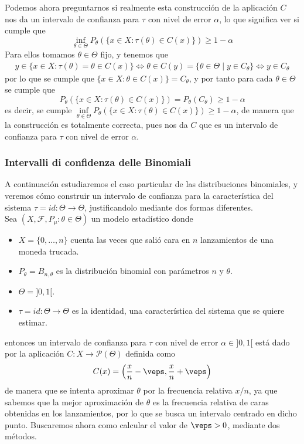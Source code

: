 \noindent
Podemos ahora preguntarnos si realmente esta construcción de la aplicación $C$ nos da un intervalo de confianza para $\tau$ con nivel de error $\alpha$, lo que significa ver si cumple que 
$$\inf_{\theta \in \Theta} P_{\theta}(\{x \in X : \tau(\theta) \in C(x)\}) \geq 1 - \alpha$$ 
Para ellos tomamos $\theta \in \Theta$ fijo, y tenemos que
\begin{align*}
    y\in \{x\in X : \tau(\theta)=\theta \in C(x)\} \iff  \theta \in C(y)=\{\theta\in \Theta \mid y\in C_{\theta}\} \iff y\in C_{\theta} 
\end{align*}
por lo que se cumple que $\{x\in X : \theta \in C(x)\} = C_{\theta}$, y por tanto para cada $\theta \in \Theta$ se cumple que
\begin{equation*}
    P_{\theta}(\{x \in X : \tau(\theta) \in C(x)\}) = P_{\theta}(C_{\theta}) \geq 1 - \alpha
\end{equation*}
es decir, se cumple $\inf\limits_{\theta \in \Theta} P_{\theta}(\{x \in X : \tau(\theta) \in C(x)\}) \geq 1 - \alpha$, de manera que la construcción es totalmente correcta, pues nos da $C$ que es un intervalo de confianza para $\tau$ con nivel de error $\alpha$.

\subsubsection{Intervalli di confidenza delle Binomiali}
\noindent
A continuación estudiaremos el caso particular de las distribuciones binomiales, y veremos cómo construir un intervalo de confianza para la característica del sistema $\tau=id: \Theta \to \Theta$, justificandolo mediante dos formas diferentes. \\
\noindent
Sea $(X, \mathcal{F}, P_{\mu}: \theta \in \Theta)$ un modelo estadístico donde 
\begin{itemize}
    \item $X=\{0,\ldots, n\}$ cuenta las veces que salió cara en $n$ lanzamientos de una moneda trucada.
    \item $P_{\theta}=B_{n,\theta}$ es la distribución binomial con parámetros $n$ y $\theta$.
    \item $\Theta=]0,1[$.
    \item $\tau=id: \Theta \to \Theta$ es la identidad, una característica del sistema que se quiere estimar.
\end{itemize}
entonces un intervalo de confianza para $\tau$ con nivel de error $\alpha \in ]0,1[$ está dado por la aplicación $C:X \to \mathcal{P}(\Theta)$ definida como
\begin{equation*}
    C(x)=\left(\dfrac{x}{n} -\veps, \dfrac{x}{n} + \veps\right)
\end{equation*}
de manera que se intenta aproximar $\theta$ por la frecuencia relativa $x/n$, ya que sabemos que la mejor aproximación de $\theta$ es la frecuencia relativa de caras obtenidas en los lanzamientos, por lo que se busca un intervalo centrado en dicho punto. Buscaremos ahora como calcular el valor de $\veps>0$, mediante dos métodos. \\ 

